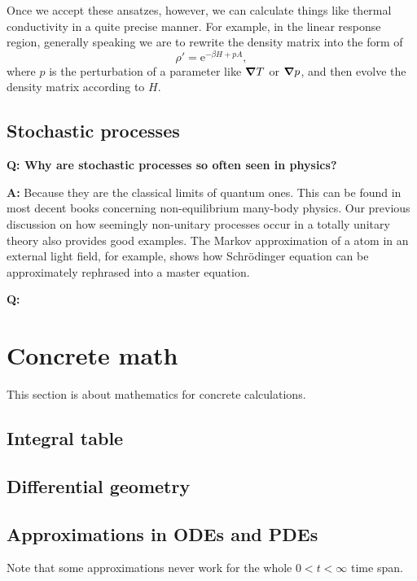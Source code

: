 \documentclass[hyperref, a4paper]{article}
\newcommand*{\ee}{\mathrm{e}}
\newenvironment{qanda}{\setlength{\parindent}{0pt}}{\bigskip}
\newcommand{\Q}{\bigskip\bfseries Q: }
\newcommand{\A}{\par\textbf{A:} \normalfont}
\begin{document}
\begin{qanda}
Once we accept these ansatzes, however, we can calculate things like thermal conductivity in a quite precise 
manner. For example, in the linear response region, generally speaking we are to rewrite the density matrix
into the form of 
\[
    \rho' = \ee^{- \beta H + p A},
\]
where $p$ is the perturbation of a parameter like $\grad T$ or $\grad p$, and then evolve the density matrix 
according to $H$. 

\end{qanda}

\subsection{Stochastic processes}

\begin{qanda}
    
\Q Why are stochastic processes so often seen in physics?
\A Because they are the classical limits of quantum ones. This can be found in most decent books concerning non-equilibrium many-body physics.
Our previous discussion on how seemingly non-unitary processes occur in a totally unitary theory also provides 
good examples. The Markov approximation of a atom in an external light field, for example, shows how Schrödinger 
equation can be approximately rephrased into a master equation. 

\Q 

\end{qanda}

\section{Concrete math}

This section is about mathematics for concrete calculations.

\subsection{Integral table}

\subsection{Differential geometry}

\subsection{Approximations in ODEs and PDEs}

Note that some approximations never work for the whole $0 < t < \infty$ time span.
\end{document}
